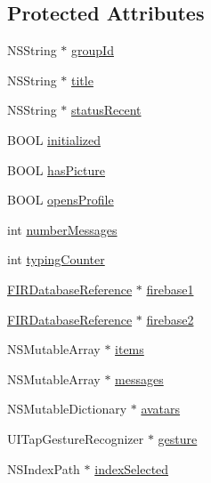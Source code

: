 \subsection*{Protected Attributes}
\begin{DoxyCompactItemize}
\item 
N\+S\+String $\ast$ \hyperlink{category_e_s_chat_view_07_08_a19b2a33c9b2182e9453855654c540857}{group\+Id}
\item 
N\+S\+String $\ast$ \hyperlink{category_e_s_chat_view_07_08_ab8d88592b083ac2957b18ab953fc2c31}{title}
\item 
N\+S\+String $\ast$ \hyperlink{category_e_s_chat_view_07_08_a91e1427c529ea59b135dda286c773acb}{status\+Recent}
\item 
B\+O\+O\+L \hyperlink{category_e_s_chat_view_07_08_a22da8049924ecf54ef6813ab286405bb}{initialized}
\item 
B\+O\+O\+L \hyperlink{category_e_s_chat_view_07_08_a20cb702c2056f87f259c409b897db21d}{has\+Picture}
\item 
B\+O\+O\+L \hyperlink{category_e_s_chat_view_07_08_a9e82734ea3b435b31c1c09d15faa258a}{opens\+Profile}
\item 
int \hyperlink{category_e_s_chat_view_07_08_a9da0d4e81f3bb115c96dbd4e9949f5fd}{number\+Messages}
\item 
int \hyperlink{category_e_s_chat_view_07_08_a3e1a290406d94af4d7974a536fdae010}{typing\+Counter}
\item 
\hyperlink{interface_f_i_r_database_reference}{F\+I\+R\+Database\+Reference} $\ast$ \hyperlink{category_e_s_chat_view_07_08_a360719a0fafbeb2f8d397412b111eba1}{firebase1}
\item 
\hyperlink{interface_f_i_r_database_reference}{F\+I\+R\+Database\+Reference} $\ast$ \hyperlink{category_e_s_chat_view_07_08_a969bd46aaca026c38170c417dcbec4b0}{firebase2}
\item 
N\+S\+Mutable\+Array $\ast$ \hyperlink{category_e_s_chat_view_07_08_ad54c5f3be09a77064859e621a179c7bc}{items}
\item 
N\+S\+Mutable\+Array $\ast$ \hyperlink{category_e_s_chat_view_07_08_a5022765b26e43b5f9fcdfa24a794c3c2}{messages}
\item 
N\+S\+Mutable\+Dictionary $\ast$ \hyperlink{category_e_s_chat_view_07_08_a6f9e3c3ad749bcf46e9bc0431294626e}{avatars}
\item 
U\+I\+Tap\+Gesture\+Recognizer $\ast$ \hyperlink{category_e_s_chat_view_07_08_a66804a0dfa11245e36e7aeeef8aab943}{gesture}
\item 
N\+S\+Index\+Path $\ast$ \hyperlink{category_e_s_chat_view_07_08_ada473e3981b341df2894d0423ffc1726}{index\+Selected}

\end{DoxyCompactItemize}
